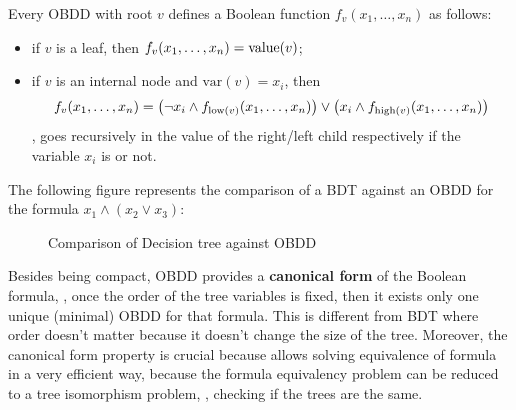 \documentclass[oneside]{academica}
\begin{document}
Every OBDD with root $v$ defines a Boolean function $f_v(x_1, \dots, x_n)$ as follows:
\begin{itemize}
  \item if $v$ is a leaf, then $f_v(x_1,\dots,x_n) = \text{value}(v)$;
  \item if $v$ is an internal node and $\text{var}(v) = x_i$, then
    \begin{equation*}
      f_v(x_1,\dots,x_n) = \left( \neg x_i \land f_{\text{low}(v)}(x_1,\dots,x_n) \right) \lor \left( x_i \land f_{\text{high}(v)}(x_1,\dots,x_n) \right)
    \end{equation*}
    \ie, goes recursively in the value of the right/left child respectively if the variable $x_i$ is \true or not.
\end{itemize}

The following figure represents the comparison of a BDT against an OBDD for the formula $x_1 \land (x_2 \lor x_3)$:
\begin{figure}[H]
  \centering
  \begin{subfigure}{0.48\textwidth}
    \begin{center}
      
    \end{center}
  \end{subfigure}
  \begin{subfigure}{0.48\textwidth}
    \begin{center}
      
    \end{center}
  \end{subfigure}
  \caption*{Comparison of Decision tree against OBDD}
\end{figure}

Besides being compact, OBDD provides a \textbf{canonical form} of the Boolean formula, \ie, once the order of the tree variables is fixed, then it exists only one unique (minimal) OBDD for that formula.
This is different from BDT where order doesn't matter because it doesn't change the size of the tree.
Moreover, the canonical form property is crucial because allows solving equivalence of formula in a very efficient way, because the formula equivalency problem can be reduced to a tree isomorphism problem, \ie, checking if the trees are the same.
\end{document}
